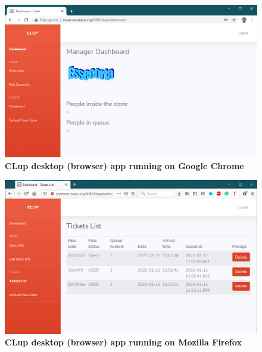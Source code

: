 \begin{figure}[!htb]
\centering
\includegraphics[width=\textwidth]{Images/Chrome}
\captionsetup{justification=centering}
\caption{\label{fig:chromeapp}\textbf{CLup desktop (browser) app running on Google Chrome}}
\end{figure}
\begin{figure}[!htb]
\centering
\includegraphics[width=\textwidth]{Images/Firefox}
\captionsetup{justification=centering}
\caption{\label{fig:firefoxapp}\textbf{CLup desktop (browser) app running on Mozilla Firefox}}
\end{figure}

